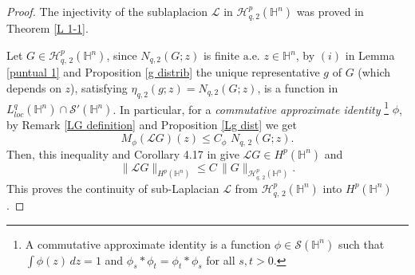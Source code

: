 \documentclass[reqno,10pt]{article}
\theoremstyle{definition}
\numberwithin{equation}{section}
\numberwithin{theorem}{section}
\begin{document}
\begin{proof} The injectivity of the sublaplacion $\mathcal{L}$ in $\mathcal{H}^{p}_{q, 2}(\mathbb{H}^{n})$ was proved in 
Theorem \ref{L 1-1}. 

Let $G \in \mathcal{H}^{p}_{q, \, 2}(\mathbb{H}^{n})$, since $N_{q, 2}(G; z)$ is finite $\text{a.e.} \,\, z \in \mathbb{H}^{n}$, by $(i)$ in 
Lemma \ref{puntual 1} and Proposition \ref{g distrib} the unique representative $g$ of $G$ (which depends on $z$), satisfying 
$\eta_{q, 2}(g; z)=N_{q, 2}(G; z)$, is a function in $L^{q}_{loc}(\mathbb{H}^{n}) \cap \mathcal{S}'(\mathbb{H}^{n})$. In particular, for
a \textit{commutative approximate identity} \footnote{A commutative approximate identity is a function $\phi \in \mathcal{S}(\mathbb{H}^{n})$ such that $\int \phi(z) \, dz = 1$ and $\phi_s \ast \phi_t = \phi_t \ast \phi_s$ for all $s,t > 0$.} $\phi$, by Remark \ref{LG definition} and Proposition \ref{Lg dist} we get
\[
M_{\phi}(\mathcal{L}G)(z) \leq C_{\phi} \,\, N_{q, \, 2}(G; z).
\]
Then, this inequality and Corollary 4.17 in \cite{Foll-St} give $\mathcal{L}G \in H^{p}(\mathbb{H}^{n})$ and 
\begin{equation} \label{continuity}
\| \mathcal{L}G \|_{H^{p}(\mathbb{H}^{n})} \leq C \, \| G \|_{\mathcal{H}^{p}_{q, \, 2}(\mathbb{H}^{n})}.
\end{equation}
This proves the continuity of sub-Laplacian $\mathcal{L}$ from $\mathcal{H}^{p}_{q, \, 2}(\mathbb{H}^{n})$ into $H^{p}(\mathbb{H}^{n})$.


\end{proof}
\end{document}
